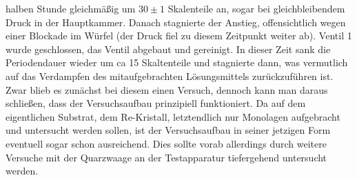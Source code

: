 halben Stunde gleichmäßig um $30\pm1$ Skalenteile an, sogar bei gleichbleibendem Druck in der
Hauptkammer. Danach stagnierte der Anstieg, offensichtlich wegen einer Blockade im Würfel (der
Druck fiel zu diesem Zeitpunkt weiter ab). Ventil 1 wurde geschlossen, das Ventil abgebaut und
gereinigt. In dieser Zeit sank die Periodendauer wieder um ca 15 Skaltenteile und stagnierte dann,
was vermutlich auf das Verdampfen des mitaufgebrachten Lösungsmittels zurückzuführen ist.\\
Zwar blieb es zunächst bei diesem einen Versuch, dennoch kann man daraus schließen, dass der
Versuchsaufbau prinzipiell funktioniert. Da auf dem eigentlichen Substrat, dem Re-Kristall,
letztendlich nur Monolagen aufgebracht und untersucht werden sollen, ist der
Versuchsaufbau in seiner jetzigen Form eventuell sogar schon ausreichend. Dies sollte vorab
allerdings durch weitere Versuche mit der Quarzwaage an der Testapparatur tiefergehend untersucht
werden.


























